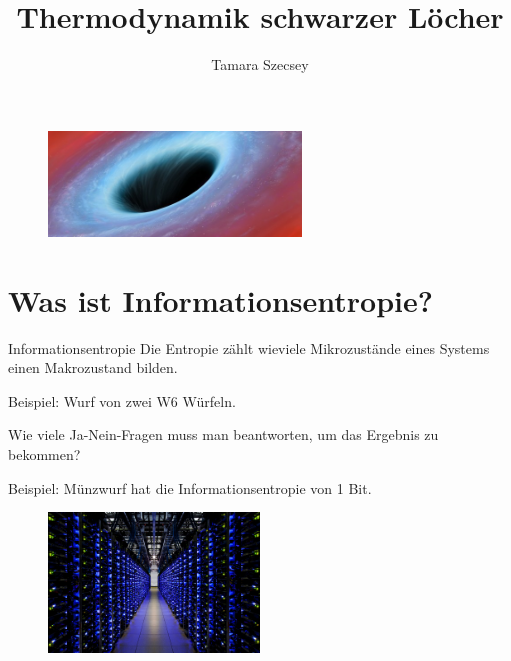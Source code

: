 \documentclass[PHONON = true, screen, ngerman]{beamer}
\title{Thermodynamik schwarzer Löcher}
\author{Tamara Szecsey}
\begin{document}
	\begin{frame}
		\maketitle
		\begin{figure} [h] 
			\begin{center}
				\includegraphics[width=0.6\textwidth]{n-117451542-large570}
			\end{center}
		\end{figure}
	\end{frame}
	
	\begin{frame}
		\tableofcontents
	\end{frame}
	
	\section{Was ist Informationsentropie?}
	\begin{frame}{Informationsentropie}
		Die Entropie zählt wieviele Mikrozustände eines Systems einen Makrozustand bilden. 
		
		Beispiel: Wurf von zwei W6 Würfeln. 
		
		Wie viele Ja-Nein-Fragen muss man beantworten, um das Ergebnis zu bekommen?
		
		Beispiel: Münzwurf hat die Informationsentropie von 1 Bit.
		\begin{figure} [h] 
			\begin{center}
				\includegraphics[width=0.5\textwidth]{Server}
			\end{center}
		\end{figure} 	 	%
	\end{frame}
	
\end{document}

